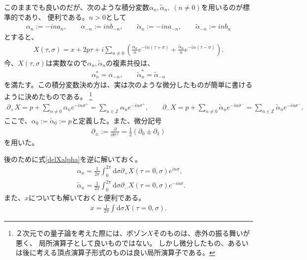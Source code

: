 \documentclass[report,paper=a4, fontsize=12pt, line_length=16cm, number_of_lines=33,dvipdfmx]{jlreq}
\numberwithin{equation}{chapter}
\numberwithin{equation}{section}
\newcommand{\Zb}{\mathbb{Z}}
\newcommand{\del}{\partial}
\newcommand{\alphat}{\tilde{\alpha}}
\newcommand{\di}{\mathrm{d}}
\begin{document}
このままでも良いのだが、次のような積分変数$\alpha_n,\alphat_n,\ (n\ne 0)$を用いるのが標準的であり、
便利である。$n>0$として
\begin{align}
\alpha_n:=-ina_n,\qquad \alpha_{-n}:=inb_{-n},\qquad
\alphat_n:=-in a_{-n},\qquad \alphat_{-n}:=inb_{n}
\end{align}
とすると、
\begin{align}
X(\tau,\sigma)=x+2p\tau+i\sum_{n\ne 0}\left(
\frac{\alpha_n}{n}e^{-in(\tau+\sigma)}
+\frac{\alphat_n}{n}e^{-in(\tau-\sigma)}
\right).
\end{align}
今、$X(\tau,\sigma)$は実数なので$\alpha_n,\alphat_n$の複素共役は、
\begin{align}
\alpha_n^{*}=\alpha_{-n},\qquad
\alphat_n^{*}=\alphat_{-n}
\end{align}
を満たす。この積分変数決め方は、実は次のような微分したものが簡単に書けるように決めたものである。
\footnote{２次元での量子論を考えた際には、ボゾン$X$そのものは、赤外の振る舞いが悪く、
局所演算子として良いものではない。
しかし微分したもの、あるいは後に考える頂点演算子形式のものは良い局所演算子である。}
\begin{align}
\del_{+}X
=p+\sum_{n\ne 0} \alpha_n e^{-in\sigma^{+}}
=\sum_{n \in \Zb} \alpha_n e^{-in\sigma^{+}}
,\qquad
\del_{-}X
=p+\sum_{n\ne 0} \alphat_n e^{-in\sigma^{-}}
=\sum_{n \in \Zb} \alphat_n e^{-in\sigma^{-}}.
\label{delXalpha}
\end{align}
ここで、$\alpha_0:=\alphat_0:=p$と定義した。また、微分記号
\begin{align}
\del_{\pm}:=\frac{\del}{\del \sigma^{\pm}} =\frac12 (\del_0 \pm \del_1)
\end{align}
を用いた。

後のために式\eqref{delXalpha}を逆に解いておく。
\begin{align}
&\alpha_n=\frac{1}{2\pi}\int_0^{2\pi} \di \sigma \del_{+} X(\tau=0,\sigma) e^{in\sigma}, \nonumber\\
&\alphat_n=\frac{1}{2\pi}\int_0^{2\pi} \di \sigma \del_{-} X(\tau=0,\sigma) e^{-in\sigma}.
\end{align}
また、$x$についても解いておくと便利である。
\begin{align}
x=\frac{1}{2\pi}\int \di\sigma X(\tau=0,\sigma).
\end{align}
\end{document}
